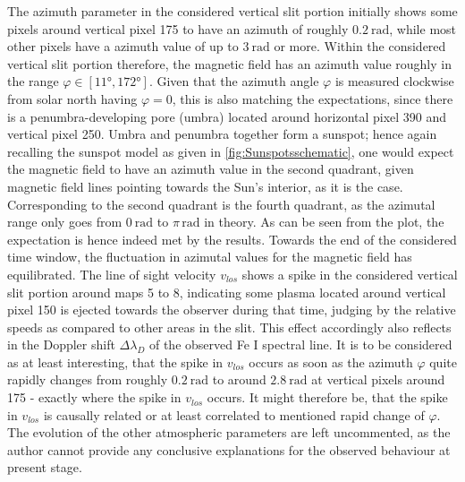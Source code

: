 \documentclass[a4paper,12pt]{report}
\begin{document}
The azimuth parameter in the considered vertical slit portion initially shows some pixels around vertical pixel 175 to have an azimuth of roughly $\SI{0.2}{\radian}$, while most other pixels have a azimuth value of up to $\SI{3}{\radian}$ or more. Within the considered vertical slit portion therefore, the magnetic field has an azimuth value roughly in the range $\varphi \in [\ang{11}, \ang{172}]$. Given that the azimuth angle $\varphi$ is measured clockwise from solar north having $\varphi=0$, this is also matching the expectations, since there is a penumbra-developing pore (umbra) located around horizontal pixel 390 and vertical pixel 250. Umbra and penumbra together form a sunspot; hence again recalling the sunspot model as given in \cref{fig:Sunspotsschematic}, one would expect the magnetic field to have an azimuth value in the second quadrant, given magnetic field lines pointing towards the Sun's interior, as it is the case. Corresponding to the second quadrant is the fourth quadrant, as the azimutal range only goes from $\SI{0}{\radian}$ to $\pi\,\si{\radian}$ in theory. As can be seen from the plot, the expectation is hence indeed met by the results. Towards the end of the considered time window, the fluctuation in azimutal values for the magnetic field has equilibrated. The line of sight velocity $v_{los}$ shows a spike in the considered vertical slit portion around maps 5 to 8, indicating some plasma located around vertical pixel 150 is ejected towards the observer during that time, judging by the relative speeds as compared to other areas in the slit. This effect accordingly also reflects in the Doppler shift $\Delta \lambda_D$ of the observed Fe I spectral line. It is to be considered as at least interesting, that the spike in $v_{los}$ occurs as soon as the azimuth $\varphi$ quite rapidly changes from roughly $\SI{0.2}{\radian}$ to around $\SI{2.8}{\radian}$ at vertical pixels around 175 - exactly where the spike in $v_{los}$ occurs. It might therefore be, that the spike in $v_{los}$ is causally related or at least correlated to mentioned rapid change of $\varphi$. The evolution of the other atmospheric parameters are left uncommented, as the author cannot provide any conclusive explanations for the observed behaviour at present stage.
\end{document}
